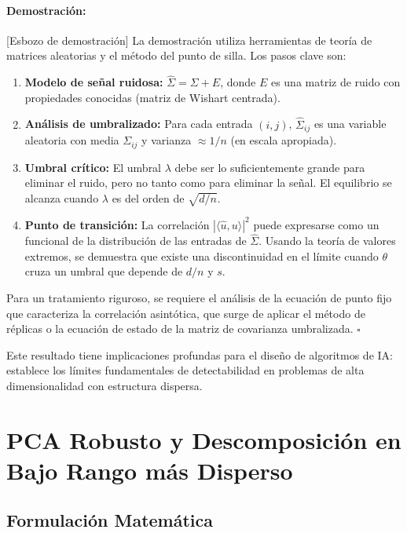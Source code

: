 \documentclass[11pt]{article}
\theoremstyle{plain}
\newenvironment{proof}{\paragraph{Demostración:}}{\hfill$\square$}
\begin{document}
\begin{proof}[Esbozo de demostración]
La demostración utiliza herramientas de teoría de matrices aleatorias y el método del punto de silla. Los pasos clave son:

\begin{enumerate}
    \item \textbf{Modelo de señal ruidosa:} $\hat{\Sigma} = \Sigma + E$, donde $E$ es una matriz de ruido con propiedades conocidas (matriz de Wishart centrada).
    
    \item \textbf{Análisis de umbralizado:} Para cada entrada $(i,j)$, $\hat{\Sigma}_{ij}$ es una variable aleatoria con media $\Sigma_{ij}$ y varianza $\approx 1/n$ (en escala apropiada).
    
    \item \textbf{Umbral crítico:} El umbral $\lambda$ debe ser lo suficientemente grande para eliminar el ruido, pero no tanto como para eliminar la señal. El equilibrio se alcanza cuando $\lambda$ es del orden de $\sqrt{d/n}$.
    
    \item \textbf{Punto de transición:} La correlación $|\langle \hat{u}, u \rangle|^2$ puede expresarse como un funcional de la distribución de las entradas de $\hat{\Sigma}$. Usando la teoría de valores extremos, se demuestra que existe una discontinuidad en el límite cuando $\theta$ cruza un umbral que depende de $d/n$ y $s$.
\end{enumerate}

Para un tratamiento riguroso, se requiere el análisis de la ecuación de punto fijo que caracteriza la correlación asintótica, que surge de aplicar el método de réplicas o la ecuación de estado de la matriz de covarianza umbralizada.
\end{proof}

Este resultado tiene implicaciones profundas para el diseño de algoritmos de IA: establece los límites fundamentales de detectabilidad en problemas de alta dimensionalidad con estructura dispersa.

\section{PCA Robusto y Descomposición en Bajo Rango más Disperso}

\subsection{Formulación Matemática}
\end{document}

